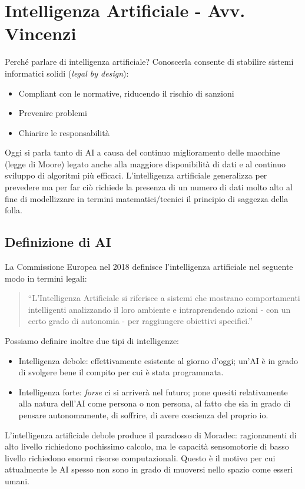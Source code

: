 \chapter{Intelligenza Artificiale - Avv. Vincenzi}

Perché parlare di intelligenza artificiale? 
Conoscerla consente di stabilire sistemi informatici solidi (\textit{legal by design}):
\begin{itemize}
    \item Compliant con le normative, riducendo il rischio di sanzioni
    \item Prevenire problemi
    \item Chiarire le responsabilità
\end{itemize}

Oggi si parla tanto di AI a causa del continuo miglioramento delle macchine (legge di Moore) legato anche alla maggiore disponibilità di dati e al continuo sviluppo di algoritmi più efficaci. 
L'intelligenza artificiale generalizza per prevedere ma per far ciò richiede la presenza di un numero di dati molto alto al fine di modellizzare in termini matematici/tecnici il principio di saggezza della folla. 

\section{Definizione di AI}
La Commissione Europea nel 2018 definisce l'intelligenza artificiale nel seguente modo in termini legali:
\begin{quote}
    ``L'Intelligenza Artificiale si riferisce a sistemi che mostrano comportamenti intelligenti analizzando il loro ambiente e intraprendendo azioni - con un certo grado di autonomia - per raggiungere obiettivi specifici.''
\end{quote}
Possiamo definire inoltre due tipi di intelligenze:
\begin{itemize}
    \item Intelligenza debole: effettivamente esistente al giorno d'oggi; un'AI è in grado di svolgere bene il compito per cui è stata programmata. 
    \item Intelligenza forte: \textit{forse} ci si arriverà nel futuro; pone quesiti relativamente alla natura dell'AI come persona o non persona, al fatto che sia in grado di pensare autonomamente, di soffrire, di avere coscienza del proprio io. 
\end{itemize}
L'intelligenza artificiale debole produce il paradosso di Moradec: ragionamenti di alto livello richiedono pochissimo calcolo, ma le capacità sensomotorie di basso livello richiedono enormi risorse computazionali. 
Questo è il motivo per cui attualmente le AI spesso non sono in grado di muoversi nello spazio come esseri umani.

